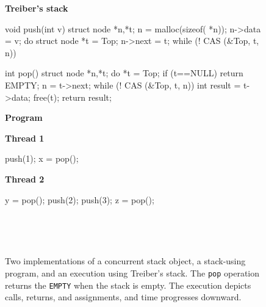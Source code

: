 \begin{figure*}[t]
  \lstset{numbers=left, 
          numberstyle=\tiny\tt, 
          stepnumber=1, 
          firstnumber=1,
          numbersep=4pt}
  \footnotesize
    \lstset{numbers=none}
  \begin{minipage}[b]{50mm}
    {\normalsize \textbf{Treiber's stack}}
    \begin{program}
void push(int v) {
  struct node *n,*t;
  n = malloc(sizeof( *n));
  n->data = v;
  do {
    struct node *t = Top;
    n->next = t;
  } while (! CAS (&Top, t, n))
}

int pop() {
  struct node *n,*t;
  do {
    *t = Top;
    if (t==NULL)
      return EMPTY;
    n = t->next;
  } while (! CAS (&Top, t, n))
  int result = t->data;
  free(t);
  return result;
}
    \end{program}
      {\normalsize \textbf{Program}} \\[1em]
        \begin{minipage}[b]{17mm}
      \textbf{Thread 1}
      \vspace{-1.5mm}
      \begin{program}
push(1);
x = pop();
      \end{program}
      \vspace{6.3mm}
    \end{minipage}
    \begin{minipage}[b]{16mm}
      \textbf{Thread 2}
      \vspace{-1.5mm}
      \begin{program}
y = pop();
push(2);
push(3);
z = pop();
      \end{program}
    \end{minipage}
  \end{minipage}
  \begin{minipage}[b]{43mm}
 \\[1em]
    
    \vspace{1cm}
  \end{minipage}
  \begin{minipage}[b]{43mm}
 \\[2em]
    
    \vspace{1.64cm}
  \end{minipage}
%    
  \caption{Two implementations of a concurrent stack object, a stack-using
  program, and an execution using Treiber's stack. The {\tt pop} operation
  returns the {\tt EMPTY} when the stack is empty. The execution depicts calls,
  returns, and assignments, and time progresses downward.}
  \label{fig:stacks}
\end{figure*}

